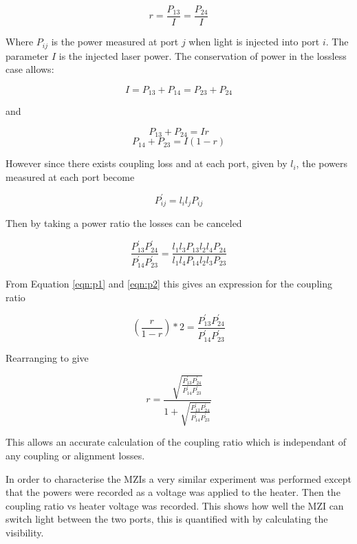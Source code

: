\begin{equation} r  = \frac{P_{13}}{I} = \frac{P_{24}}{I} \end{equation}

Where $P_{ij}$ is the power measured at port $j$ when light is injected into
port $i$. The parameter $I$ is the injected laser power. The conservation of
power in the lossless case allows:

\begin{equation} I = P_{13}+P_{14} = P_{23}+P_{24} \end{equation}

and

\begin{equation}\label{eqn:p1} P_{13}+P_{24} = Ir \end{equation}\label{eqn:p2}
\begin{equation} P_{14}+P_{23} = I(1-r) \end{equation}

However since there exists coupling loss and at each port, given by $l_i$, the
powers measured at each port become

\begin{equation} P^{'}_{ij} = l_i l_j P_{ij} \end{equation}

Then by taking a power ratio the losses can be canceled

\begin{equation} \frac{ P^{'}_{13} P^{'}_{24} }{ P^{'}_{14} P^{'}_{23} } =
\frac{ l_1 l_3 P_{13} l_2 l_4 P_{24} }{ l_1l_4P_{14}l_2l_3P_{23} }
\end{equation}

From Equation \ref{eqn:p1} and \ref{eqn:p2} this gives an expression for the
coupling ratio

\begin{equation} \left(\frac{r}{1-r}\right)*2 = \frac{P^{'}_{13}
P^{'}_{24}}{P^{'}_{14} P^{'}_{23}} \end{equation}

Rearranging to give

\begin{equation} r = \frac{\sqrt{\frac{P^{'}_{13} P^{'}_{24}}{P^{'}_{14}
P^{'}_{23}}}}{1+ \sqrt{\frac{P^{'}_{13} P^{'}_{24}}{P^{'}_{14} P^{'}_{23}}}}
\end{equation}

This allows an accurate calculation of the coupling ratio which is independant
of any coupling or alignment losses.

In order to characterise the MZIs a very similar experiment was performed except
that the powers were recorded as a voltage was applied to the heater. Then the
coupling ratio vs heater voltage was recorded. This shows how well the MZI can
switch light between the two ports, this is quantified with by calculating the
visibility.

